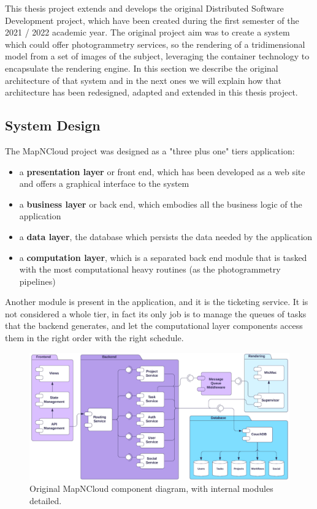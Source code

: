 This thesis project extends and develops the original Distributed Software Development project, which have been created during the first semester of the 2021 / 2022 academic year. The original project aim was to create a system which could offer photogrammetry services, so the rendering of a tridimensional model from a set of images of the subject, leveraging the container technology to encapsulate the rendering engine. In this section we describe the original architecture of that system and in the next ones we will explain how that architecture has been redesigned, adapted and extended in this thesis project. 

\subsection{System Design}
\label{sse:originalsystemdesign}
  The MapNCloud project was designed as a "three plus one" tiers application:
  \begin{itemize}
    \item a \textbf{presentation layer} or front end, which has been developed as a web site and offers a graphical interface to the system
    \item a \textbf{business layer} or back end, which embodies all the business logic of the application
    \item a \textbf{data layer}, the database which persists the data needed by the application
    \item a \textbf{computation layer}, which is a separated back end module that is tasked with the most computational heavy routines (as the photogrammetry pipelines)
  \end{itemize}
  Another module is present in the application, and it is the ticketing service. It is not considered a whole tier, in fact its only job is to manage the queues of tasks that the backend generates, and let the computational layer components access them in the right order with the right schedule.
  \begin{figure}[H]
    \centering
    \includegraphics[width = \textwidth]{../Images/MNCOriginal.png}
    \caption{Original MapNCloud component diagram, with internal modules detailed.}
  \end{figure}

